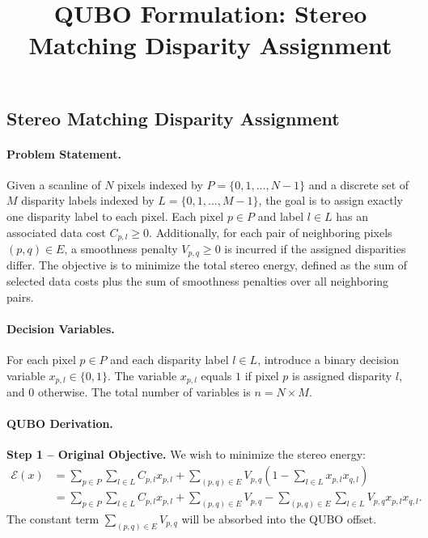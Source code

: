 \documentclass[12pt]{article}
\title{QUBO Formulation: Stereo Matching Disparity Assignment}
\date{}
\begin{document}
\maketitle

\subsection*{Stereo Matching Disparity Assignment}

\paragraph{Problem Statement.}
Given a scanline of $N$ pixels indexed by $P = \{0, 1, \dots, N-1\}$ and a discrete set of $M$ disparity labels indexed by $L = \{0, 1, \dots, M-1\}$, the goal is to assign exactly one disparity label to each pixel. Each pixel $p \in P$ and label $l \in L$ has an associated data cost $C_{p,l} \geq 0$. Additionally, for each pair of neighboring pixels $(p,q) \in E$, a smoothness penalty $V_{p,q} \geq 0$ is incurred if the assigned disparities differ. The objective is to minimize the total stereo energy, defined as the sum of selected data costs plus the sum of smoothness penalties over all neighboring pairs.

\paragraph{Decision Variables.}
For each pixel $p \in P$ and each disparity label $l \in L$, introduce a binary decision variable $x_{p,l} \in \{0,1\}$. The variable $x_{p,l}$ equals $1$ if pixel $p$ is assigned disparity $l$, and $0$ otherwise. The total number of variables is $n = N \times M$.

\paragraph{QUBO Derivation.}
\textbf{Step 1 -- Original Objective.}
We wish to minimize the stereo energy:
\begin{align}
\mathcal{E}(x) &= \sum_{p \in P} \sum_{l \in L} C_{p,l} x_{p,l} + \sum_{(p,q) \in E} V_{p,q} \left( 1 - \sum_{l \in L} x_{p,l} x_{q,l} \right) \\
&= \sum_{p \in P} \sum_{l \in L} C_{p,l} x_{p,l} + \sum_{(p,q) \in E} V_{p,q} - \sum_{(p,q) \in E} \sum_{l \in L} V_{p,q} x_{p,l} x_{q,l}.
\end{align}
The constant term $\sum_{(p,q) \in E} V_{p,q}$ will be absorbed into the QUBO offset.
\end{document}
